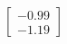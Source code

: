 \documentclass[preview]{standalone}
\begin{document}
\begin{align*}
\begin{bmatrix} -0.99 \\ -1.19 \end{bmatrix}
\end{align*}
\end{document}
